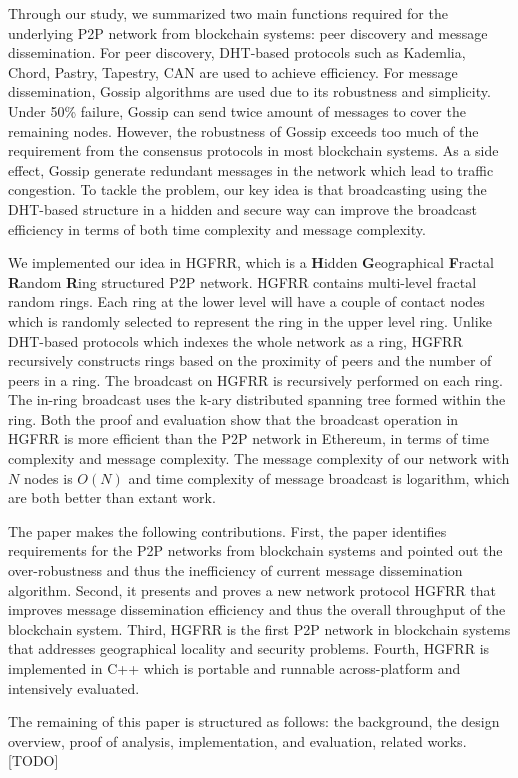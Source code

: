 Through our study, we summarized two main functions required for the underlying P2P network from blockchain systems: peer discovery and message dissemination. For peer discovery, DHT-based protocols such as Kademlia, Chord, Pastry, Tapestry, CAN are used to achieve efficiency. For message dissemination, Gossip algorithms are used due to its robustness and simplicity. Under 50\% failure, Gossip can send twice amount of messages to cover the remaining nodes. However, the robustness of Gossip exceeds too much of the requirement from the consensus protocols in most blockchain systems. As a side effect, Gossip generate redundant messages in the network which lead to traffic congestion. To tackle the problem, our key idea is that broadcasting using the DHT-based structure in a hidden and secure way can improve the broadcast efficiency in terms of both time complexity and message complexity.

We implemented our idea in HGFRR, which is a \textbf{H}idden \textbf{G}eographical \textbf{F}ractal \textbf{R}andom \textbf{R}ing structured P2P network. HGFRR contains multi-level fractal random rings. Each ring at the lower level will have a couple of contact nodes which is randomly selected to represent the ring in the upper level ring. Unlike DHT-based protocols which indexes the whole network as a ring, HGFRR recursively constructs rings based on the proximity of peers and the number of peers in a ring. The broadcast on HGFRR is recursively performed on each ring. The in-ring broadcast uses the k-ary distributed spanning tree formed within the ring. Both the proof and evaluation show that the broadcast operation in HGFRR is more efficient than the P2P network in Ethereum, in terms of time complexity and message complexity. The message complexity of our network with $N$ nodes is $O(N)$ and time complexity of message broadcast is logarithm, which are both better than extant work.

The paper makes the following contributions. First, the paper identifies requirements for the P2P networks from blockchain systems and pointed out the over-robustness and thus the inefficiency of current message dissemination algorithm. Second, it presents and proves a new network protocol HGFRR that improves message dissemination efficiency and thus the overall throughput of the blockchain system. Third, HGFRR is the first P2P network in blockchain systems that addresses geographical locality and security problems. Fourth, HGFRR is implemented in C++ which is portable and runnable across-platform and intensively evaluated.

The remaining of this paper is structured as follows: the background, the design overview, proof of analysis, implementation, and evaluation, related works. [TODO]